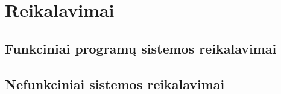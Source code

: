 

\section{Reikalavimai}

\subsection{Funkciniai programų sistemos reikalavimai}
	
\subsection{Nefunkciniai sistemos reikalavimai}
